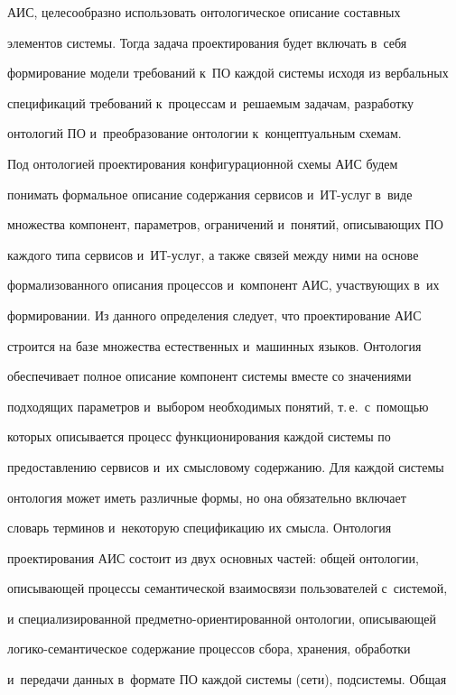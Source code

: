 АИС, целесообразно использовать онтологическое описание составных 


элементов системы. Тогда задача проектирования будет включать в~себя 


формирование модели требований к~ПО каждой системы исходя из вербальных 


спецификаций требований к~процессам и~решаемым задачам, разработку 


онтологий ПО и~преобразование онтологии к~концептуальным схемам. 


  


  Под онтологией проектирования конфигурационной схемы АИС будем 


понимать формальное описание содержания сервисов и~ИТ-услуг в~виде 


множества компонент, параметров, ограничений и~понятий, описывающих ПО 


каждого типа сервисов и~ИТ-услуг, а также связей между ними на основе 


формализованного описания процессов и~компонент АИС, участвующих в~их 


формировании. Из данного определения следует, что проектирование АИС 


строится на базе множества естественных и~машинных языков. Онтология 


обеспечивает полное описание компонент системы вместе со значениями 


подходящих параметров и~выбором необходимых понятий, т.\,е.\ с~помощью 


которых описывается процесс функционирования каждой системы по 


предоставлению сервисов и~их смысловому содержанию. Для каждой системы 


онтология может иметь различные формы, но она обязательно включает 


словарь терминов и~некоторую спецификацию их смысла. Онтология 


проектирования АИС состоит из двух основных частей: общей онтологии, 


описывающей процессы семантической взаимосвязи пользователей с~системой, 


и специализированной пред\-мет\-но-ори\-ен\-ти\-ро\-ван\-ной онтологии, описывающей 


логико-семантическое содержание процессов сбора, хранения, обработки 


и~передачи данных в~формате ПО каждой системы (сети), подсистемы. Общая 


